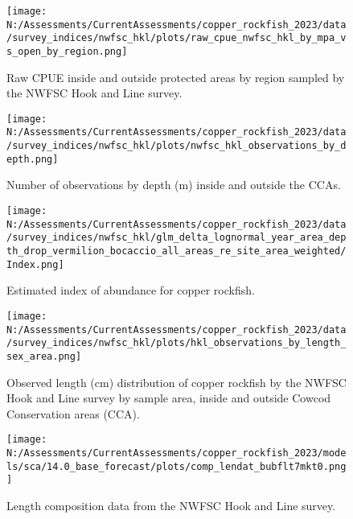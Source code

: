 \documentclass[11pt,
  english,
  letterpaper,
]{article}
\begin{document}
\pagebreak

\begin{figure}
\centering
\texttt{[image: N:/Assessments/CurrentAssessments/copper\_rockfish\_2023/data/survey\_indices/nwfsc\_hkl/plots/raw\_cpue\_nwfsc\_hkl\_by\_mpa\_vs\_open\_by\_region.png]}
\caption{Raw CPUE inside and outside protected areas by region sampled by the NWFSC Hook and Line survey.\label{fig:nwfsc-hkl-region-main}}
\end{figure}

\pagebreak

\begin{figure}
\centering
\texttt{[image: N:/Assessments/CurrentAssessments/copper\_rockfish\_2023/data/survey\_indices/nwfsc\_hkl/plots/nwfsc\_hkl\_observations\_by\_depth.png]}
\caption{Number of observations by depth (m) inside and outside the CCAs.\label{fig:nwfsc-hkl-depth}}
\end{figure}

\pagebreak

\begin{figure}
\centering
\texttt{[image: N:/Assessments/CurrentAssessments/copper\_rockfish\_2023/data/survey\_indices/nwfsc\_hkl/glm\_delta\_lognormal\_year\_area\_depth\_drop\_vermilion\_bocaccio\_all\_areas\_re\_site\_area\_weighted/Index.png]}
\caption{Estimated index of abundance for copper rockfish.\label{fig:nwfsc-hkl-index-main}}
\end{figure}

\pagebreak

\begin{figure}
\centering
\texttt{[image: N:/Assessments/CurrentAssessments/copper\_rockfish\_2023/data/survey\_indices/nwfsc\_hkl/plots/hkl\_observations\_by\_length\_sex\_area.png]}
\caption{Observed length (cm) distribution of copper rockfish by the NWFSC Hook and Line survey by sample area, inside and outside Cowcod Conservation areas (CCA).\label{fig:nwfsc-hkl-site-len}}
\end{figure}

\pagebreak

\begin{figure}
\centering
\texttt{[image: N:/Assessments/CurrentAssessments/copper\_rockfish\_2023/models/sca/14.0\_base\_forecast/plots/comp\_lendat\_bubflt7mkt0.png]}
\caption{Length composition data from the NWFSC Hook and Line survey.\label{fig:hkl-len-data}}
\end{figure}
\end{document}
